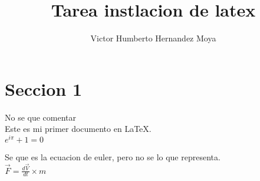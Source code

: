 \documentclass[a4paper,10pt]{article}
\title{Tarea instlacion de latex} %
\author{Victor Humberto Hernandez Moya} %
\begin{document}
\maketitle

% 

\section{Seccion 1}

No se que comentar  \\ %

Este es mi primer documento en \LaTeX.\\ %

$ e^{i \pi} + 1 = 0 $  %

Se que es la ecuacion de euler, pero no se lo que representa.  \\ %

$ \vec{F} = \frac{d\vec{V}}{dt} \times m  $  %
\end{document}
